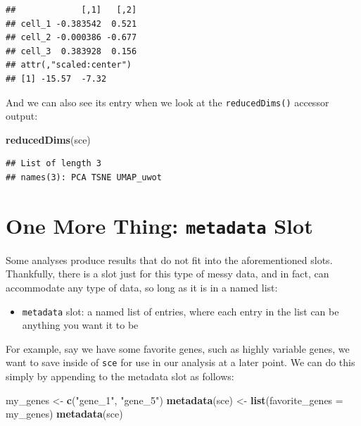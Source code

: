 \documentclass[]{book}
\newenvironment{Shaded}{\begin{snugshade}}{\end{snugshade}}
\newcommand{\DataTypeTok}[1]{\textcolor[rgb]{0.13,0.29,0.53}{#1}}
\newcommand{\KeywordTok}[1]{\textcolor[rgb]{0.13,0.29,0.53}{\textbf{#1}}}
\newcommand{\NormalTok}[1]{#1}
\newcommand{\StringTok}[1]{\textcolor[rgb]{0.31,0.60,0.02}{#1}}
\providecommand{\tightlist}{%
  \setlength{\itemsep}{0pt}\setlength{\parskip}{0pt}}
\begin{document}
\begin{verbatim}
##             [,1]   [,2]
## cell_1 -0.383542  0.521
## cell_2 -0.000386 -0.677
## cell_3  0.383928  0.156
## attr(,"scaled:center")
## [1] -15.57  -7.32
\end{verbatim}

And we can also see its entry when we look at the \texttt{reducedDims()} accessor output:

\begin{Shaded}
\begin{Highlighting}[]
\KeywordTok{reducedDims}\NormalTok{(sce)}
\end{Highlighting}
\end{Shaded}

\begin{verbatim}
## List of length 3
## names(3): PCA TSNE UMAP_uwot
\end{verbatim}

\hypertarget{one-more-thing-metadata-slot}{%
\section{\texorpdfstring{One More Thing: \texttt{metadata} Slot}{One More Thing: metadata Slot}}\label{one-more-thing-metadata-slot}}

Some analyses produce results that do not fit into the aforementioned slots. Thankfully, there is a slot just for this type of messy data, and in fact, can accommodate any type of data, so long as it is in a named list:

\begin{itemize}
\tightlist
\item
  \texttt{metadata} slot: a named list of entries, where each entry in the list can be anything you want it to be
\end{itemize}

For example, say we have some favorite genes, such as highly variable genes, we want to save inside of \texttt{sce} for use in our analysis at a later point. We can do this simply by appending to the metadata slot as follows:

\begin{Shaded}
\begin{Highlighting}[]
\NormalTok{my_genes <-}\StringTok{ }\KeywordTok{c}\NormalTok{(}\StringTok{"gene_1"}\NormalTok{, }\StringTok{"gene_5"}\NormalTok{)}
\KeywordTok{metadata}\NormalTok{(sce) <-}\StringTok{ }\KeywordTok{list}\NormalTok{(}\DataTypeTok{favorite_genes =}\NormalTok{ my_genes)}
\KeywordTok{metadata}\NormalTok{(sce)}
\end{Highlighting}
\end{Shaded}
\end{document}
